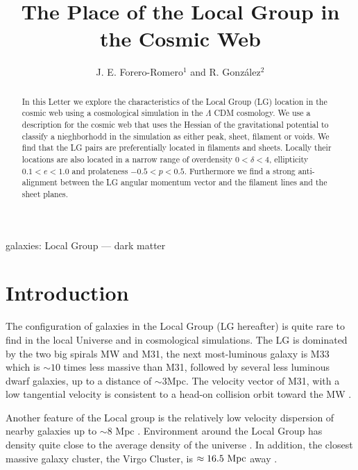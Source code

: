 \documentclass{emulateapj}
\newcommand{\mpc}{\rm{Mpc}}
\begin{document}
\title{The Place of the Local Group in the Cosmic Web}
\author{J. E. Forero-Romero$^1$ and R. Gonz\'alez$^2$}


\begin{abstract}
In this Letter we explore the characteristics of the Local Group (LG)
location in the cosmic web using a cosmological simulation in the
$\Lambda$ CDM cosmology.
We use a description for the cosmic web that uses the Hessian of the
gravitational potential to classify a nieghborhodd in the simulation
as either peak, sheet, filament or voids. We find that the LG pairs
are preferentially located in filaments and sheets. Locally their
locations are also located in a narrow range of overdensity
$0<\delta<4$, ellipticity $0.1<e<1.0$ and prolateness
$-0.5<p<0.5$. Furthermore we find a strong anti-alignment between the
LG angular momentum vector and the filament lines and the sheet 
planes.  
\end{abstract}

\begin{keywords}
{galaxies: Local Group --- dark matter}
\end{keywords}


\section{Introduction}
\label{sec:intro}

The configuration of galaxies in the Local Group (LG hereafter) is
quite rare to find in the local Universe and in cosmological
simulations. The LG is dominated by the two big spirals MW and M31, the next
most-luminous galaxy is M33 which is $\sim 10$ times less massive than
M31, followed by several less luminous dwarf galaxies, up to a
distance of $\sim 3$\mpc.   The velocity vector of M31, with a low
tangential velocity is consistent to a head-on collision orbit toward
the MW
\citep{2008MNRAS.386..461C,2012ApJ...753....8V,2012ApJ...753....7S}.   

Another feature of the Local group is the relatively low velocity
dispersion of nearby galaxies up to $\sim 8$ Mpc \citep[][and
  references therein]{1975ApJ...196..313S,2011MNRAS.415L..16A}. 
Environment around the Local Group has density quite close to the
average density of the universe
\citep{2003ApJ...596...19K,2005AJ....129..178K}. In addition, the
closest massive galaxy cluster, the Virgo Cluster, is $\approx
16.5\ \mpc$ away \citep{2007ApJ...655..144M}.  
\end{document}
